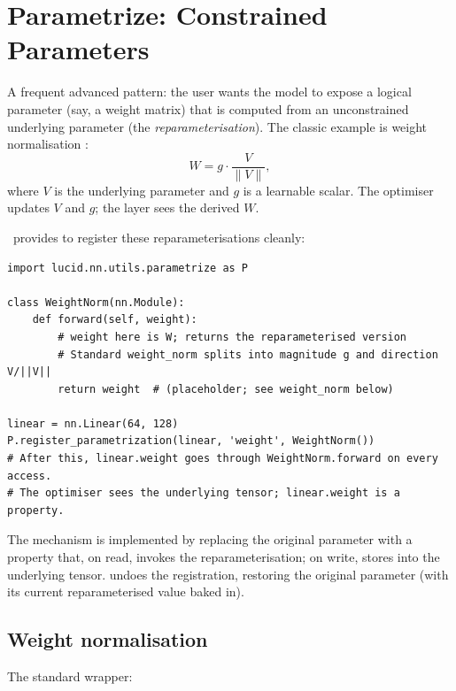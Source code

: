 \section{Parametrize: Constrained Parameters}
\label{sec:module_system:parametrize}

A frequent advanced pattern: the user wants the model to expose
a logical parameter (say, a weight matrix) that is computed from
an unconstrained underlying parameter (the
\emph{reparameterisation}). The classic example is weight
normalisation \cite{miyato_specnorm_2018}:
\[
  W = g \cdot \frac{V}{\|V\|},
\]
where $V$ is the underlying parameter and $g$ is a learnable
scalar. The optimiser updates $V$ and $g$; the layer sees the
derived $W$.

\Lucid\ provides  to register
these reparameterisations cleanly:

\begin{lstlisting}[style=lucid,language=LucidPython]
import lucid.nn.utils.parametrize as P

class WeightNorm(nn.Module):
    def forward(self, weight):
        # weight here is W; returns the reparameterised version
        # Standard weight_norm splits into magnitude g and direction V/||V||
        return weight  # (placeholder; see weight_norm below)

linear = nn.Linear(64, 128)
P.register_parametrization(linear, 'weight', WeightNorm())
# After this, linear.weight goes through WeightNorm.forward on every access.
# The optimiser sees the underlying tensor; linear.weight is a property.
\end{lstlisting}

The mechanism is implemented by replacing the original
parameter with a property that, on read, invokes the
reparameterisation; on write, stores into the underlying
tensor.  undoes the
registration, restoring the original parameter (with its
current reparameterised value baked in).

\subsection{Weight normalisation}
\label{ssec:module_system:weight_norm}

The standard wrapper:


